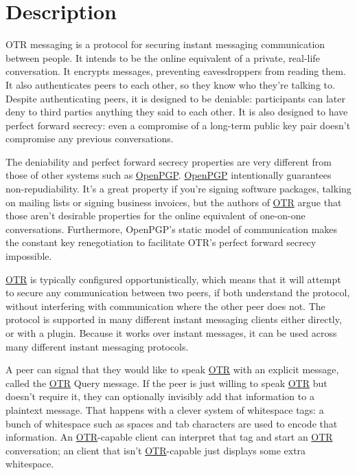 \documentclass[11pt,ebook,table,dvipsnames]{memoir}
\begin{document}
\section{Description}
\label{sec-3-3-1}

\Gls{OTR} messaging is a protocol for securing instant messaging
communication between people\cite{borisov:otr}. It intends to be the
online equivalent of a private, real-life conversation. It encrypts
messages, preventing eavesdroppers from reading them. It also
authenticates peers to each other, so they know who they're talking
to. Despite authenticating peers, it is designed to be deniable:
participants can later deny to third parties anything they said to
each other. It is also designed to have perfect forward secrecy: even
a compromise of a long-term public key pair doesn't compromise any
previous conversations.

The deniability and perfect forward secrecy properties are very
different from those of other systems such as \hyperref[OpenPGP]{OpenPGP}. \hyperref[OpenPGP]{OpenPGP}
intentionally guarantees non-repudiability. It's a great property if
you're signing software packages, talking on mailing lists or signing
business invoices, but the authors of \hyperref[OTR]{OTR} argue that those aren't
desirable properties for the online equivalent of one-on-one
conversations. Furthermore, OpenPGP's static model of communication
makes the constant key renegotiation to facilitate OTR's perfect
forward secrecy impossible.

\hyperref[OTR]{OTR} is typically configured opportunistically, which means that it
will attempt to secure any communication between two peers, if both
understand the protocol, without interfering with communication where
the other peer does not. The protocol is supported in many different
instant messaging clients either directly, or with a plugin. Because
it works over instant messages, it can be used across many different
instant messaging protocols.

A peer can signal that they would like to speak \hyperref[OTR]{OTR} with an explicit
message, called the \hyperref[OTR]{OTR} Query message. If the peer is just willing to
speak \hyperref[OTR]{OTR} but doesn't require it, they can optionally invisibly add
that information to a plaintext message. That happens with a clever
system of whitespace tags: a bunch of whitespace such as spaces and
tab characters are used to encode that information. An \hyperref[OTR]{OTR}-capable
client can interpret that tag and start an \hyperref[OTR]{OTR} conversation; an client
that isn't \hyperref[OTR]{OTR}-capable just displays some extra whitespace.
\end{document}
